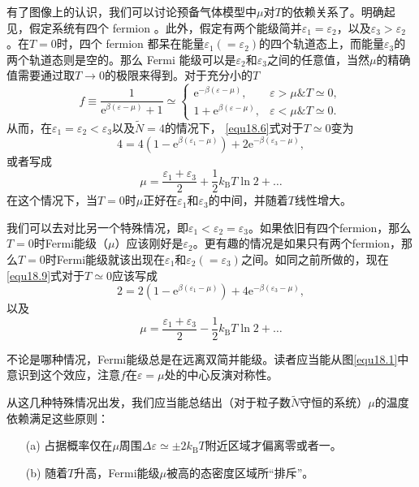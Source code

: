 有了图像上的认识，我们可以讨论预备气体模型中$\mu$对$T$的依赖关系了。明确起见，假定系统有四个 fermion 。此外，假定有两个能级简并$\varepsilon_1=\varepsilon_2$，以及$\varepsilon_3>\varepsilon_2$。在$T=0$时，四个 fermion 都呆在能量$\varepsilon_1(=\varepsilon_2)$的四个轨道态上，而能量$\varepsilon_3$的两个轨道态则是空的。那么 Fermi 能级可以是$\varepsilon_2$和$\varepsilon_3$之间的任意值，当然$\mu$的精确值需要通过取$T\rightarrow 0$的极限来得到。对于充分小的$T$
\begin{equation}
f\equiv \frac{1}{\mathrm e^{\beta(\varepsilon-\mu)}+1}\simeq \begin{cases}
\mathrm e^{-\beta(\varepsilon-\mu)}, & \varepsilon>\mu\& T\simeq 0, \\
1+\mathrm e^{\beta(\varepsilon-\mu)}, & \varepsilon<\mu\& T\simeq 0.
\end{cases}
\end{equation}
从而，在$\varepsilon_1=\varepsilon_2<\varepsilon_3$以及$\tilde N=4$的情况下， \eqref{equ18.6}式对于$T\simeq 0$变为
\begin{equation}
4=4(1-\mathrm e^{\beta(\varepsilon_1-\mu)})+2\mathrm e^{-\beta(\varepsilon_3-\mu)},
\label{equ18.9}
\end{equation}
或者写成
\begin{equation}
\mu = \frac{\varepsilon_1+\varepsilon_3}{2}+\frac{1}{2}k_\text{B}T\ln 2+\dots
\end{equation}
在这个情况下，当$T=0$时$\mu$正好在$\varepsilon_1$和$\varepsilon_3$的中间，并随着$T$线性增大。

我们可以去对比另一个特殊情况，即$\varepsilon_1<\varepsilon_2=\varepsilon_3$。如果依旧有四个fermion，那么$T=0$时Fermi能级（$\mu$）应该刚好是$\varepsilon_2$。更有趣的情况是如果只有两个fermion，那么$T=0$时Fermi能级就该出现在$\varepsilon_1$和$\varepsilon_2(=\varepsilon_3)$之间。如同之前所做的，现在\eqref{equ18.9}式对于$T\simeq 0$应该写成
\begin{equation}
2=2(1-\mathrm e^{\beta(\varepsilon_1-\mu)})+4\mathrm e^{-\beta(\varepsilon_3-\mu)},
\end{equation}
以及
\begin{equation}
\mu = \frac{\varepsilon_1+\varepsilon_3}{2}-\frac{1}{2}k_\text{B}T\ln 2+\dots
\end{equation}

不论是哪种情况，Fermi能级总是在远离双简并能级。读者应当能从图\ref{equ18.1}中意识到这个效应，注意$f$在$\varepsilon=\mu$处的中心反演对称性。

从这几种特殊情况出发，我们应当能总结出（对于粒子数$\tilde N$守恒的系统）$\mu$的温度依赖满足这些原则：
\begin{itemize}
\item[(a)] 占据概率仅在$\mu$周围$\Delta\varepsilon\simeq\pm 2k_\text{B}T$附近区域才偏离零或者一。
\item[(b)] 随着$T$升高，Fermi能级$\mu$被高的态密度区域所``排斥''。
\end{itemize}


